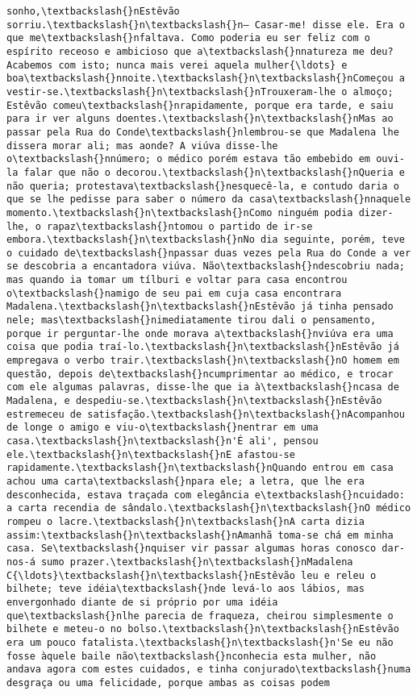 \documentclass[11pt]{article}
\begin{document}
\begin{Verbatim}[commandchars=\\\{\}]
sonho,\textbackslash{}nEstêvão sorriu.\textbackslash{}n\textbackslash{}n— Casar-me! disse ele. Era o que me\textbackslash{}nfaltava. Como poderia eu ser feliz com o espírito receoso e ambicioso que a\textbackslash{}nnatureza me deu? Acabemos com isto; nunca mais verei aquela mulher{\ldots} e boa\textbackslash{}nnoite.\textbackslash{}n\textbackslash{}nComeçou a vestir-se.\textbackslash{}n\textbackslash{}nTrouxeram-lhe o almoço; Estêvão comeu\textbackslash{}nrapidamente, porque era tarde, e saiu para ir ver alguns doentes.\textbackslash{}n\textbackslash{}nMas ao passar pela Rua do Conde\textbackslash{}nlembrou-se que Madalena lhe dissera morar ali; mas aonde? A viúva disse-lhe o\textbackslash{}nnúmero; o médico porém estava tão embebido em ouvi-la falar que não o decorou.\textbackslash{}n\textbackslash{}nQueria e não queria; protestava\textbackslash{}nesquecê-la, e contudo daria o que se lhe pedisse para saber o número da casa\textbackslash{}nnaquele momento.\textbackslash{}n\textbackslash{}nComo ninguém podia dizer-lhe, o rapaz\textbackslash{}ntomou o partido de ir-se embora.\textbackslash{}n\textbackslash{}nNo dia seguinte, porém, teve o cuidado de\textbackslash{}npassar duas vezes pela Rua do Conde a ver se descobria a encantadora viúva. Não\textbackslash{}ndescobriu nada; mas quando ia tomar um tílburi e voltar para casa encontrou o\textbackslash{}namigo de seu pai em cuja casa encontrara Madalena.\textbackslash{}n\textbackslash{}nEstêvão já tinha pensado nele; mas\textbackslash{}nimediatamente tirou dali o pensamento, porque ir perguntar-lhe onde morava a\textbackslash{}nviúva era uma coisa que podia traí-lo.\textbackslash{}n\textbackslash{}nEstêvão já empregava o verbo trair.\textbackslash{}n\textbackslash{}nO homem em questão, depois de\textbackslash{}ncumprimentar ao médico, e trocar com ele algumas palavras, disse-lhe que ia à\textbackslash{}ncasa de Madalena, e despediu-se.\textbackslash{}n\textbackslash{}nEstêvão estremeceu de satisfação.\textbackslash{}n\textbackslash{}nAcompanhou de longe o amigo e viu-o\textbackslash{}nentrar em uma casa.\textbackslash{}n\textbackslash{}n'É ali', pensou ele.\textbackslash{}n\textbackslash{}nE afastou-se rapidamente.\textbackslash{}n\textbackslash{}nQuando entrou em casa achou uma carta\textbackslash{}npara ele; a letra, que lhe era desconhecida, estava traçada com elegância e\textbackslash{}ncuidado: a carta recendia de sândalo.\textbackslash{}n\textbackslash{}nO médico rompeu o lacre.\textbackslash{}n\textbackslash{}nA carta dizia assim:\textbackslash{}n\textbackslash{}nAmanhã toma-se chá em minha casa. Se\textbackslash{}nquiser vir passar algumas horas conosco dar-nos-á sumo prazer.\textbackslash{}n\textbackslash{}nMadalena C{\ldots}\textbackslash{}n\textbackslash{}nEstêvão leu e releu o bilhete; teve idéia\textbackslash{}nde levá-lo aos lábios, mas envergonhado diante de si próprio por uma idéia que\textbackslash{}nlhe parecia de fraqueza, cheirou simplesmente o bilhete e meteu-o no bolso.\textbackslash{}n\textbackslash{}nEstêvão era um pouco fatalista.\textbackslash{}n\textbackslash{}n'Se eu não fosse àquele baile não\textbackslash{}nconhecia esta mulher, não andava agora com estes cuidados, e tinha conjurado\textbackslash{}numa desgraça ou uma felicidade, porque ambas as coisas podem 
\end{Verbatim}
\end{document}
